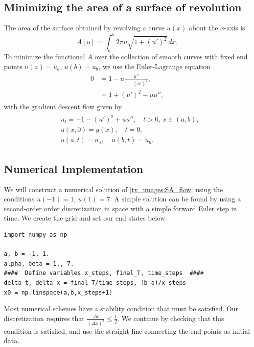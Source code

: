\subsection*{Minimizing the area of a surface of revolution}
The area of the surface obtained by revolving a curve $u(x)$ about the $x$-axis is
\[A[u] = \int_a^b 2 \pi u \sqrt{1 + (u')^2} \, dx.
\]
To minimize the functional $A$ over the collection of smooth curves with fixed end points $u(a) = u_a$, $u(b) = u_b$, we use the Euler-Lagrange equation
\begin{align}
    \begin{split}
    0 &= 1 - u \frac{u''}{1 + (u')^2} , \\
    &= 1 + (u')^2 - u u'',
    \end{split}\label{tv_images:SA_EL_equation}
\end{align}
with the gradient descent flow given by
\begin{align}
    \begin{split}
    &{ } u_t = -1 - (u')^2 + u u'',\quad t > 0,\, x \in (a,b), \\
    &{ } u(x,0) = g(x), \quad t = 0,\\
    &{ } u(a,t) = u_a, \quad u(b,t) = u_b.
    \end{split}\label{tv_images:SA_flow}
\end{align}

\subsection*{Numerical Implementation}
We will construct a numerical solution of \eqref{tv_images:SA_flow} using the conditions $u(-1) = 1$, $u(1) = 7$.
A simple solution can be found by using a second-order order discretization in space  with a simple forward Euler step in time. We create the grid and set our end states below.
\begin{lstlisting}
import numpy as np

a, b = -1, 1.
alpha, beta = 1., 7.
####  Define variables x_steps, final_T, time_steps  ####
delta_t, delta_x = final_T/time_steps, (b-a)/x_steps
x0 = np.linspace(a,b,x_steps+1)
\end{lstlisting}

Most numerical schemes have a stability condition that must be satisfied. Our discretization requires that $\frac{\Delta t}{(\Delta x)^2} \leq \frac{1}{2}$.
We continue by checking that this condition is satisfied, and use the straight line connecting the end points as initial data.

